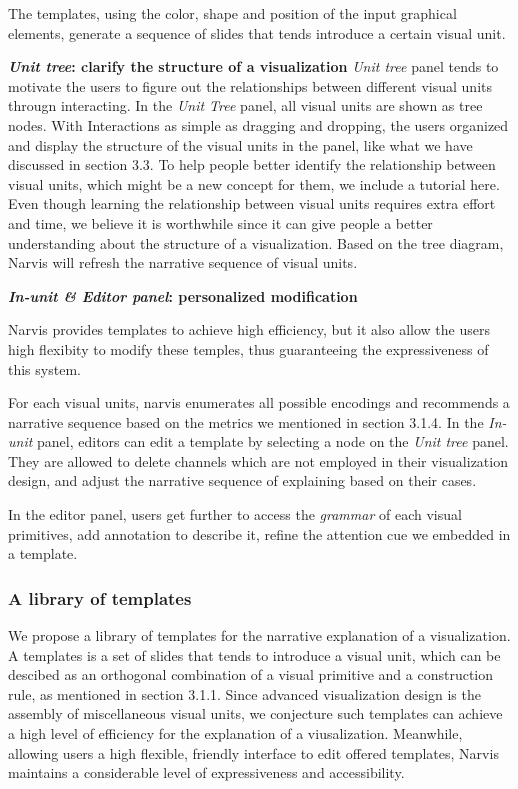 The templates, using the color, shape and position of the input graphical elements, generate a sequence of slides that tends introduce a certain visual unit.

\textbf{\textit{Unit tree}: clarify the structure of a visualization}
\textit{Unit tree} panel tends to motivate the users to figure out the relationships between different visual units througn interacting.  
In the \textit{Unit Tree} panel, all visual units are shown as tree nodes.
With Interactions as simple as dragging and dropping, the users organized and display the structure of the visual units in the panel, like what we have discussed in section 3.3. To help people better identify the relationship between visual units, which might be a new concept for them, we include a tutorial here. Even though learning the relationship between visual units requires extra effort and time, we believe it is worthwhile since it can give people a better understanding about the structure of a visualization. Based on the tree diagram, Narvis will refresh the narrative sequence of visual units. 

 \textbf{\textit{ In-unit \& Editor panel}: personalized modification}
 
 Narvis provides templates to achieve high efficiency, but it also allow the users high flexibity to modify these temples, thus guaranteeing the expressiveness of this system. 
 
For each visual units, narvis enumerates all possible encodings and recommends a narrative sequence based on the metrics we mentioned in section 3.1.4. In the \textit{In-unit} panel, editors can edit a template by selecting a node on the \textit{Unit tree} panel. They are allowed to delete channels which are not employed in their visualization design,  and adjust the narrative sequence of explaining based on their cases. 
 
In the editor panel, users get further to access the \textit{grammar} of each visual primitives, add annotation to describe it, refine the attention cue we embedded in a template. 

\subsubsection{A library of templates}
We propose a library of templates for the narrative explanation of a visualization. A templates is a set of slides that tends to introduce a visual unit, which can be descibed as an orthogonal combination of a visual primitive and a construction rule, as mentioned in section 3.1.1. Since advanced visualization design is the assembly of miscellaneous visual units, we conjecture such templates can achieve a high level of efficiency for the explanation of a viusalization. Meanwhile, allowing users a high flexible, friendly interface to edit offered templates, Narvis maintains a considerable level of expressiveness and accessibility. 

